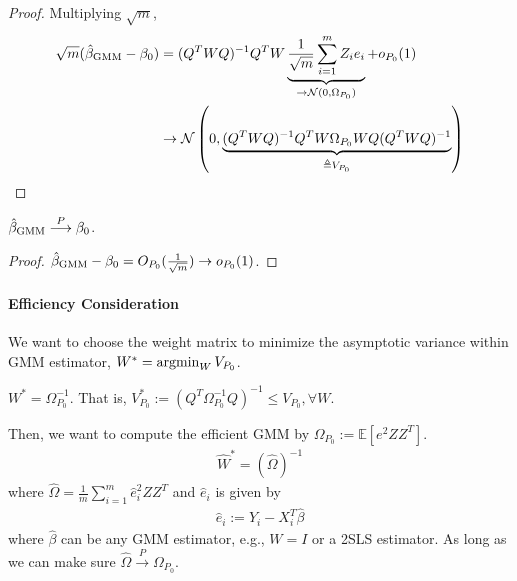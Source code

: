 \documentclass[11pt]{elegantbook}
\newcommand{\argmin}{\operatornamewithlimits{argmin}}
\begin{document}
\begin{proof}
    Multiplying $\sqrt{m}$,
    \begin{equation}
        \begin{aligned}
            \sqrt{m}(\hat{\beta}_\textnormal{GMM}-\beta_0)&=(Q^TWQ)^{-1}Q^TW\underbrace{\frac{1}{\sqrt{m}}\sum_{i=1}^mZ_ie_i}_{\rightarrow \mathcal{N}(0,\Omega_{P_0})}+o_{P_0}(1)\\
            &\rightarrow \mathcal{N}\left(0,\underbrace{(Q^TWQ)^{-1}Q^TW\Omega_{P_0}WQ(Q^TWQ)^{-1}}_{\triangleq V_{P_0}}\right)
        \end{aligned}
        \nonumber
    \end{equation}
\end{proof}

\begin{corollary}
    $\hat{\beta}_\textnormal{GMM} \stackrel{P}{\longrightarrow} \beta_0$.
\end{corollary}
\begin{proof}
    $\hat{\beta}_\textnormal{GMM}-\beta_0=O_{P_0}(\frac{1}{\sqrt{m}}) \rightarrow o_{P_0}(1)$.
\end{proof}


\paragraph*{Efficiency Consideration} We want to choose the weight matrix to minimize the asymptotic variance within GMM estimator, $W^*=\argmin_{W}V_{P_0}$.
\begin{theorem}
    $W^*=\Omega_{P_0}^{-1}$. That is, $V^*_{P_0}:=\left(Q^T\Omega_{P_0}^{-1}Q\right)^{-1}\leq V_{P_0}, \forall W$.
\end{theorem}
Then, we want to compute the efficient GMM by $\Omega_{P_0}:=\mathbb{E}[e^2ZZ^T]$.
\begin{equation}
    \begin{aligned}
        \hat{W}^*=\left(\hat{\Omega}\right)^{-1}
    \end{aligned}
    \nonumber
\end{equation}
where $\hat{\Omega}=\frac{1}{m}\sum_{i=1}^m\hat{e}_i^2ZZ^T$ and $\hat{e}_i$ is given by
\begin{equation}
    \begin{aligned}
        \hat{e}_i:=Y_i-X_i^T\hat{\beta}
    \end{aligned}
    \nonumber
\end{equation}
where $\hat{\beta}$ can be any GMM estimator, e.g., $W=I$ or a 2SLS estimator. As long as we can make sure $\hat{\Omega}\stackrel{P}{\longrightarrow}\Omega_{P_0}$.
\end{document}
